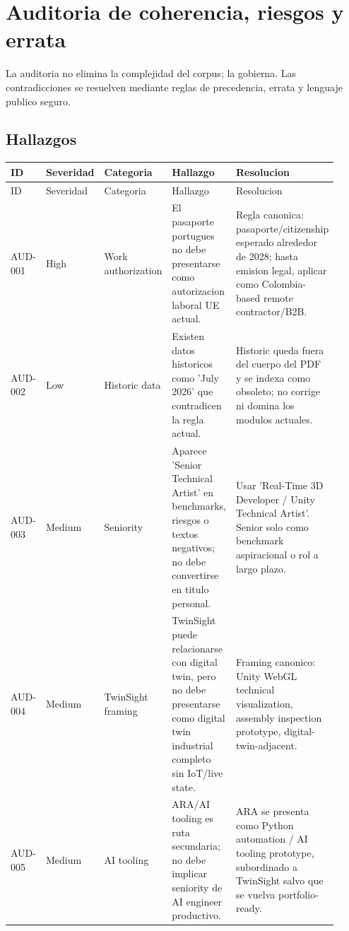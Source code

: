 \chapter{Auditoria de coherencia, riesgos y errata}


La auditoria no elimina la complejidad del corpus; la gobierna. Las contradicciones se resuelven mediante reglas de precedencia, errata y lenguaje publico seguro.


\section{Hallazgos}


\begin{center}
\scriptsize
\begin{longtable}{>{\raggedright\arraybackslash}p{0.184\linewidth} >{\raggedright\arraybackslash}p{0.184\linewidth} >{\raggedright\arraybackslash}p{0.184\linewidth} >{\raggedright\arraybackslash}p{0.184\linewidth} >{\raggedright\arraybackslash}p{0.184\linewidth}}
\toprule
ID & Severidad & Categoria & Hallazgo & Resolucion \\
\midrule
\endfirsthead
\toprule
ID & Severidad & Categoria & Hallazgo & Resolucion \\
\midrule
\endhead
AUD-001 & High & Work authorization & El pasaporte portugues no debe presentarse como autorizacion laboral UE actual. & Regla canonica: pasaporte/citizenship esperado alrededor de 2028; hasta emision legal, aplicar como Colombia-based remote contractor/B2B. \\
AUD-002 & Low & Historic data & Existen datos historicos como 'July 2026' que contradicen la regla actual. & Historic queda fuera del cuerpo del PDF y se indexa como obsoleto; no corrige ni domina los modulos actuales. \\
AUD-003 & Medium & Seniority & Aparece 'Senior Technical Artist' en benchmarks, riesgos o textos negativos; no debe convertirse en titulo personal. & Usar 'Real-Time 3D Developer / Unity Technical Artist'. Senior solo como benchmark aspiracional o rol a largo plazo. \\
AUD-004 & Medium & TwinSight framing & TwinSight puede relacionarse con digital twin, pero no debe presentarse como digital twin industrial completo sin IoT/live state. & Framing canonico: Unity WebGL technical visualization, assembly inspection prototype, digital-twin-adjacent. \\
AUD-005 & Medium & AI tooling & ARA/AI tooling es ruta secundaria; no debe implicar seniority de AI engineer productivo. & ARA se presenta como Python automation / AI tooling prototype, subordinado a TwinSight salvo que se vuelva portfolio-ready. \\

\end{longtable}
\end{center}
